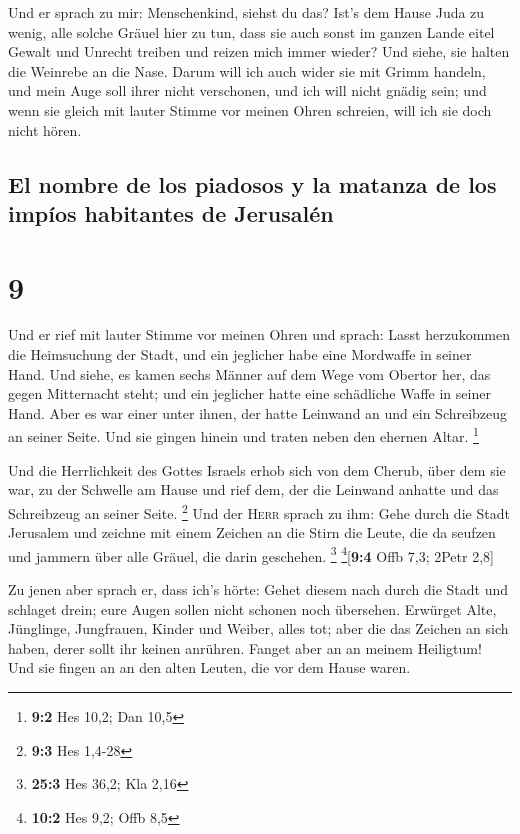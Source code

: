  Und er sprach zu mir: Menschenkind, siehst du das? Ist's
dem Hause Juda zu wenig, alle solche Gräuel hier zu tun, dass sie auch
sonst im ganzen Lande eitel Gewalt und Unrecht treiben und reizen mich
immer wieder? Und siehe, sie halten die Weinrebe an die Nase.
 Darum will ich auch wider sie mit Grimm handeln, und
mein Auge soll ihrer nicht verschonen, und ich will nicht gnädig sein;
und wenn sie gleich mit lauter Stimme vor meinen Ohren schreien, will
ich sie doch nicht hören.

\hypertarget{el-nombre-de-los-piadosos-y-la-matanza-de-los-impuxedos-habitantes-de-jerusaluxe9n}{%
\subsection{El nombre de los piadosos y la matanza de los impíos
habitantes de
Jerusalén}\label{el-nombre-de-los-piadosos-y-la-matanza-de-los-impuxedos-habitantes-de-jerusaluxe9n}}

\hypertarget{section-8}{%
\section{9}\label{section-8}}

 Und er rief mit lauter Stimme vor meinen Ohren und
sprach: Lasst herzukommen die Heimsuchung der Stadt, und ein jeglicher
habe eine Mordwaffe in seiner Hand.  Und siehe, es kamen
sechs Männer auf dem Wege vom Obertor her, das gegen Mitternacht steht;
und ein jeglicher hatte eine schädliche Waffe in seiner Hand. Aber es
war einer unter ihnen, der hatte Leinwand an und ein Schreibzeug an
seiner Seite. Und sie gingen hinein und traten neben den ehernen Altar.
\footnote{\textbf{9:2} Hes 10,2; Dan 10,5}

 Und die Herrlichkeit des Gottes Israels erhob sich von
dem Cherub, über dem sie war, zu der Schwelle am Hause und rief dem, der
die Leinwand anhatte und das Schreibzeug an seiner Seite. \footnote{\textbf{9:3}
  Hes 1,4-28}  Und der \textsc{Herr} sprach zu ihm: Gehe
durch die Stadt Jerusalem und zeichne mit einem Zeichen an die Stirn die
Leute, die da seufzen und jammern über alle Gräuel, die darin geschehen.
\footnote{\textbf{25:3} Hes 36,2; Kla 2,16} \footnote{\textbf{10:2} Hes
  9,2; Offb 8,5}{[}\textbf{9:4} Offb 7,3; 2Petr 2,8{]}

 Zu jenen aber sprach er, dass ich's hörte: Gehet diesem
nach durch die Stadt und schlaget drein; eure Augen sollen nicht schonen
noch übersehen.  Erwürget Alte, Jünglinge, Jungfrauen,
Kinder und Weiber, alles tot; aber die das Zeichen an sich haben, derer
sollt ihr keinen anrühren. Fanget aber an an meinem Heiligtum! Und sie
fingen an an den alten Leuten, die vor dem Hause waren.

